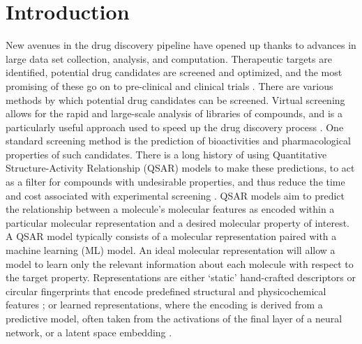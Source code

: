 \documentclass[pdflatex,sn-basic]{sn-jnl}%
\theoremstyle{thmstyleone}%
\theoremstyle{thmstyletwo}%
\theoremstyle{thmstylethree}%
\begin{document}
\section{Introduction}\label{sec1}

New avenues in the drug discovery pipeline have opened up thanks to advances in large data set collection, analysis, and computation. Therapeutic targets are identified, potential drug candidates are screened and optimized, and the most promising of these go on to pre-clinical and clinical trials \citep{Lill2007}. There are various methods by which potential drug candidates can be screened. Virtual screening allows for the rapid and large-scale analysis of libraries of compounds, and is a particularly useful approach used to speed up the drug discovery process \citep{Neves2018}. One standard screening method is the prediction of bioactivities and pharmacological properties of such candidates. There is a long history of using Quantitative Structure-Activity Relationship (QSAR) models to make these predictions, to act as a filter for compounds with undesirable properties, and thus reduce the time and cost associated with experimental screening \citep{Sabando2021}. QSAR models aim to predict the relationship between a molecule's molecular features as encoded within a particular molecular representation and a desired molecular property \citep{Sabando2021} of interest. A QSAR model typically consists of a molecular representation paired with a machine learning (ML) model. An ideal molecular representation will allow a model to learn only the relevant information about each molecule with respect to the target property. Representations are either `static' hand-crafted descriptors or circular fingerprints that encode predefined structural and physicochemical features \citep{Rogers2010, David2020, sns}; or learned representations, where the encoding is derived from a predictive model, often taken from the activations of the final layer of a neural network, or a latent space embedding \citep{Sabando2021, kishimoto2023}. 
\end{document}
